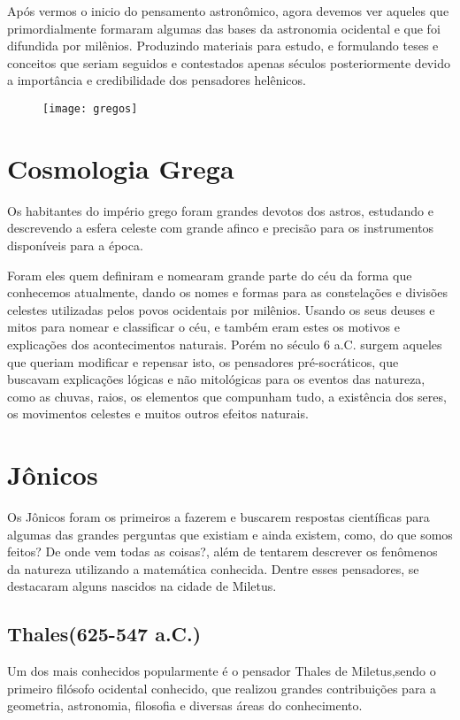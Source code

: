 Após vermos o inicio do pensamento astronômico, agora devemos ver aqueles que primordialmente formaram algumas das bases da astronomia ocidental e que foi difundida por milênios. Produzindo materiais para estudo, e formulando teses e conceitos que seriam seguidos e contestados apenas séculos posteriormente devido a importância e credibilidade dos pensadores helênicos.

\begin{figure}[ht!]
\texttt{[image: gregos]}
\end{figure}
\section*{Cosmologia Grega}
Os habitantes do império grego foram grandes devotos dos astros, estudando e descrevendo a esfera celeste com grande afinco e precisão para os instrumentos disponíveis para a época.

Foram eles quem definiram e nomearam grande parte do céu da forma que conhecemos atualmente, dando os nomes e formas para as constelações e divisões celestes utilizadas pelos povos ocidentais por milênios. Usando os seus deuses e mitos para nomear e classificar o céu, e também eram estes os motivos e explicações dos acontecimentos naturais. Porém no século 6 a.C. surgem aqueles que queriam modificar e repensar isto, os pensadores pré-socráticos, que buscavam explicações lógicas e não mitológicas para os eventos das natureza, como as chuvas, raios, os elementos que compunham tudo, a existência dos seres, os movimentos celestes e muitos outros efeitos naturais.
\section*{Jônicos}
Os Jônicos foram os primeiros a fazerem e buscarem respostas científicas para algumas das grandes perguntas que existiam e ainda existem, como, do que somos feitos? De onde vem todas as coisas?, além de tentarem descrever os fenômenos da natureza utilizando a matemática conhecida. Dentre esses pensadores, se destacaram alguns nascidos na cidade de Miletus.
\subsection*{Thales(625-547 a.C.)}
Um dos mais conhecidos popularmente é o pensador Thales de Miletus,sendo o primeiro filósofo ocidental conhecido, que realizou grandes contribuições para a geometria, astronomia, filosofia e diversas áreas do conhecimento.

